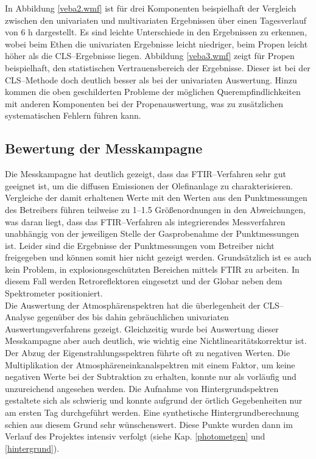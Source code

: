 

In Abbildung \ref{veba2.wmf} ist für drei Komponenten beispielhaft
der Vergleich zwischen den univariaten und multivariaten
Ergebnissen über einen Tagesverlauf von 6 h dargestellt. Es sind
leichte Unterschiede in den Ergebnissen zu erkennen, wobei beim
Ethen die univariaten Ergebnisse leicht niedriger, beim Propen
leicht höher als die CLS--Ergebnisse liegen. Abbildung
\ref{veba3.wmf} zeigt für Propen beispielhaft, den statistischen
Vertrauensbereich der Ergebnisse. Dieser ist bei der CLS--Methode
doch deutlich besser als bei der univariaten Auswertung. Hinzu
kommen die oben geschilderten Probleme der möglichen
Querempfindlichkeiten mit anderen Komponenten bei der
Propenauswertung, was zu zusätzlichen systematischen Fehlern
führen kann.\\

\subsection{\label{raffbewert}Bewertung der Messkampagne}

Die Messkampagne hat deutlich gezeigt, dass das FTIR--Verfahren
sehr gut geeignet ist, um die diffusen Emissionen der Olefinanlage
zu charakterisieren. Vergleiche der damit erhaltenen Werte mit den
Werten aus den Punktmessungen des Betreibers führen teilweise zu
1--1.5 Größenordnungen in den Abweichungen, was daran liegt, dass
das FTIR--Verfahren als integrierendes Messverfahren unabhängig
von der jeweiligen Stelle der Gasprobenahme der Punktmessungen
ist. Leider sind die Ergebnisse der Punktmessungen vom Betreiber
nicht freigegeben und können somit hier nicht gezeigt werden.
Grundsätzlich ist es auch kein Problem, in explosionsgeschützten
Bereichen mittels FTIR zu arbeiten. In diesem Fall werden
Retroreflektoren eingesetzt und der Globar neben dem Spektrometer
positioniert.\\

Die Auswertung der Atmosphärenspektren hat die überlegenheit der
CLS--Analyse gegenüber des bis dahin gebräuchlichen univariaten
Auswertungsverfahrens gezeigt. Gleichzeitig wurde bei Auswertung
dieser Messkampagne aber auch deutlich, wie wichtig eine
Nichtlinearitätskorrektur ist. Der Abzug der
Eigenstrahlungsspektren führte oft zu negativen Werten. Die
Multiplikation der Atmosphäreneinkanalspektren mit einem Faktor,
um keine negativen Werte bei der Subtraktion zu erhalten, konnte
nur als vorläufig und unzureichend angesehen werden. Die Aufnahme
von Hintergrundspektren gestaltete sich als schwierig und konnte
aufgrund der örtlich Gegebenheiten nur am ersten Tag
durchgeführt werden. Eine synthetische Hintergrundberechnung
schien aus diesem Grund sehr wünschenswert. Diese Punkte wurden
dann im Verlauf des Projektes intensiv verfolgt (siehe Kap.
\ref{photometgen} und \ref{hintergrund}).\\

